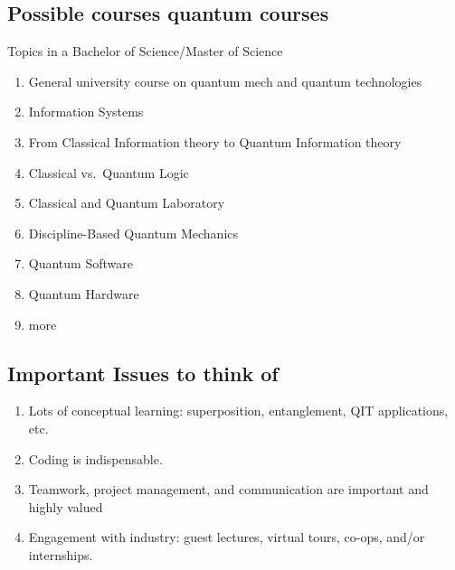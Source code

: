 \documentclass[%
oneside,                 %
final,                   %
10pt]{article}
\begin{document}
\noindent
\subsection{Possible courses quantum courses}

\begin{block}{Topics  in a Bachelor of Science/Master of Science }
\begin{enumerate}
\item General university course on quantum mech and quantum technologies

\item Information Systems 

\item From Classical Information theory to Quantum Information theory

\item Classical vs.~Quantum Logic

\item Classical and Quantum Laboratory 

\item Discipline-Based Quantum Mechanics 

\item Quantum Software

\item Quantum Hardware

\item more
\end{enumerate}

\noindent
\end{block}

\subsection{Important Issues to think of}

\begin{enumerate}
\item Lots of conceptual learning: superposition, entanglement, QIT applications, etc.

\item Coding is indispensable. 

\item Teamwork, project management, and communication are important and highly valued

\item Engagement with industry: guest lectures, virtual tours, co-ops, and/or internships.
\end{enumerate}
\end{document}
